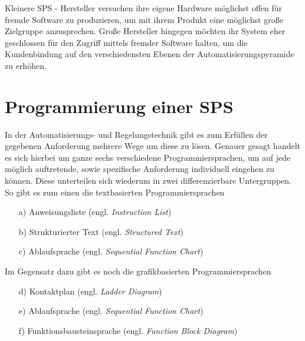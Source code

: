 	
	Kleinere SPS - Hersteller versuchen ihre eigene Hardware möglichst offen für fremde Software zu produzieren, um mit ihrem Produkt eine möglichst große Zielgruppe anzusprechen. Große Hersteller hingegen möchten ihr System eher geschlossen für den Zugriff mittels fremder Software halten, um die Kundenbindung auf den verschiedensten Ebenen der Automatisierungspyramide zu erhöhen.
	
	\section{Programmierung einer SPS}

	In der Automatisierungs- und Regelungstechnik gibt es zum Erfüllen der gegebenen Anforderung mehrere Wege um diese zu lösen. Genauer gesagt handelt es sich hierbei um ganze sechs verschiedene Programmiersprachen, um auf jede möglich auftretende, sowie spezifische Anforderung individuell eingehen zu können. Diese unterteilen sich wiederum in zwei differenzierbare Untergruppen. So gibt es zum einen die textbasierten Programmiersprachen
	
	\begin{itemize}
		\item[a)] Anweisungsliste (engl. \textit{Instruction List})
		\item[b)] Strukturierter Text (engl. \textit{Structured Text})
		\item[c)] Ablaufsprache (engl. \textit{Sequential Function Chart})
	\end{itemize}

	Im Gegensatz dazu gibt es noch die grafikbasierten Programmiersprachen
	
	\begin{itemize}
		\item[d)] Kontaktplan (engl. \textit{Ladder Diagram})
		\item[e)] Ablaufsprache (engl. \textit{Sequential Function Chart})
		\item[f)] Funktionsbausteinsprache (engl. \textit{Function Block Diagram})
	\end{itemize}
	
